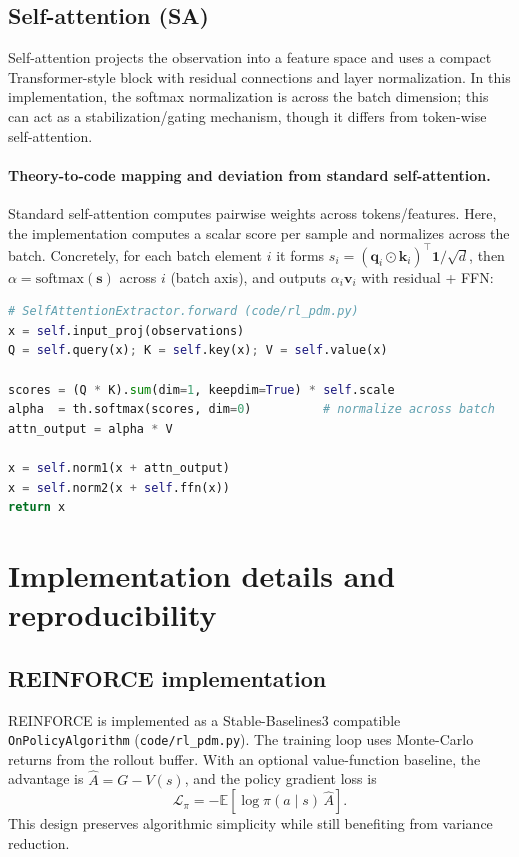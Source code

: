 \documentclass[11pt]{article}
\begin{document}
\subsection{Self-attention (SA)}
Self-attention projects the observation into a feature space and uses a compact Transformer-style block with residual connections and layer normalization. In this implementation, the softmax normalization is across the batch dimension; this can act as a stabilization/gating mechanism, though it differs from token-wise self-attention.

\paragraph{Theory-to-code mapping and deviation from standard self-attention.}
Standard self-attention computes pairwise weights across tokens/features. Here, the implementation computes a scalar score per sample and normalizes across the batch. Concretely, for each batch element $i$ it forms $s_i=(\mathbf{q}_i\odot\mathbf{k}_i)^\top\mathbf{1}/\sqrt{d}$, then $\alpha=\mathrm{softmax}(\mathbf{s})$ across $i$ (batch axis), and outputs $\alpha_i\mathbf{v}_i$ with residual + FFN:
\begin{lstlisting}[language=Python]
# SelfAttentionExtractor.forward (code/rl_pdm.py)
x = self.input_proj(observations)
Q = self.query(x); K = self.key(x); V = self.value(x)

scores = (Q * K).sum(dim=1, keepdim=True) * self.scale
alpha  = th.softmax(scores, dim=0)          # normalize across batch
attn_output = alpha * V

x = self.norm1(x + attn_output)
x = self.norm2(x + self.ffn(x))
return x
\end{lstlisting}

\section{Implementation details and reproducibility}
\label{sec:implementation}
\subsection{REINFORCE implementation}
\label{sec:reinforce_impl}
REINFORCE is implemented as a Stable-Baselines3 compatible \texttt{OnPolicyAlgorithm} (\texttt{code/rl\_pdm.py}). The training loop uses Monte-Carlo returns from the rollout buffer. With an optional value-function baseline, the advantage is $\hat{A}=G-V(s)$, and the policy gradient loss is
\begin{equation}
	\mathcal{L}_{\pi} = -\mathbb{E}[\log\pi(a\mid s)\,\hat{A}].
\end{equation}
This design preserves algorithmic simplicity while still benefiting from variance reduction.
\end{document}
